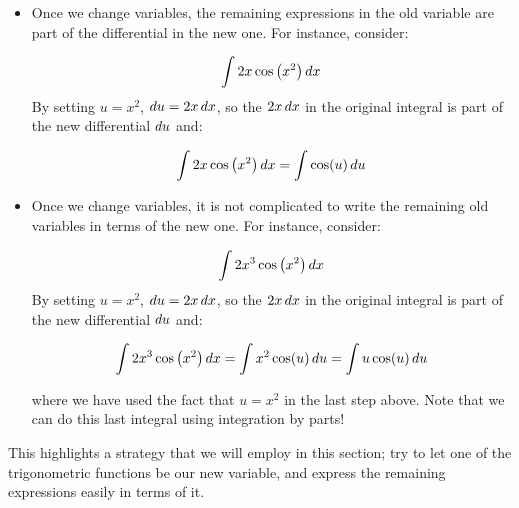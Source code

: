 \documentclass{ximera}
\begin{document}
\begin{itemize}
\item Once we change variables, the remaining expressions in the old variable are part of the differential in the new one.  For instance, consider:

\[ \int 2x \cos\left(x^2\right) \mathop{}\!d x\]
By setting $u=x^2$, $\mathop{}\!d u = 2x \mathop{}\!d x$, so the $2x \mathop{}\!d x$ in the original integral is part of the new differential $\mathop{}\!d u$ and:

\[ \int 2x \cos\left(x^2\right) \mathop{}\!d x = \int \cos(u) \mathop{}\!d u \]

\item Once we change variables, it is not complicated to write the remaining old variables in terms of the new one.
For instance, consider:

\[ \int 2x^3 \cos\left(x^2\right) \mathop{}\!d x\]
By setting $u=x^2$, $\mathop{}\!d u = 2x \mathop{}\!d x$, so the $2x \mathop{}\!d x$ in the original integral is part of the new differential $\mathop{}\!d u$ and:

\[ \int 2x^3 \cos\left(x^2\right) \mathop{}\!d x = \int x^2 \cos(u) \mathop{}\!d u  = \int u \cos(u) \mathop{}\!d u \]

where we have used the fact that $u=x^2$ in the last step above.  Note that we can do this last integral using integration by parts!
\end{itemize}

This highlights a strategy that we will employ in this section; try to let one of the trigonometric functions be our new variable, and express the remaining expressions easily in terms of it.
\end{document}
